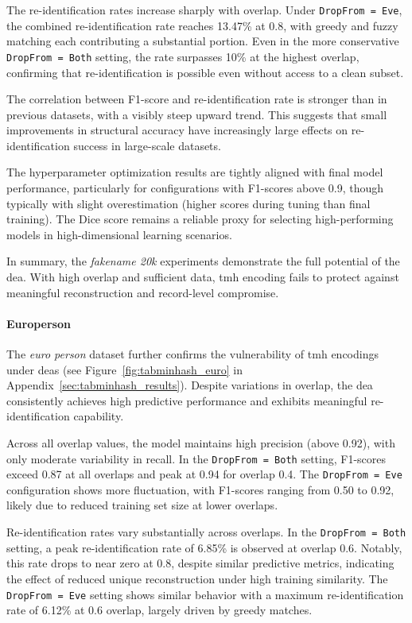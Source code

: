 The re-identification rates increase sharply with overlap.
Under \texttt{DropFrom = Eve}, the combined re-identification rate reaches 13.47\% at 0.8, with greedy and fuzzy matching each contributing a substantial portion.
Even in the more conservative \texttt{DropFrom = Both} setting, the rate surpasses 10\% at the highest overlap, confirming that re-identification is possible even without access to a clean subset.

The correlation between F1-score and re-identification rate is stronger than in previous datasets, with a visibly steep upward trend.
This suggests that small improvements in structural accuracy have increasingly large effects on re-identification success in large-scale datasets.

The hyperparameter optimization results are tightly aligned with final model performance, particularly for configurations with F1-scores above 0.9, though typically with slight overestimation (higher scores during tuning than final training).
The Dice score remains a reliable proxy for selecting high-performing models in high-dimensional learning scenarios.

In summary, the \textit{fakename 20k} experiments demonstrate the full potential of the \ac{dea}.
With high overlap and sufficient data, \ac{tmh} encoding fails to protect against meaningful reconstruction and record-level compromise.


\paragraph{Europerson}

The \textit{euro person} dataset further confirms the vulnerability of \ac{tmh} encodings under \ac{dea}s (see Figure~\ref{fig:tabminhash_euro} in Appendix~\ref{sec:tabminhash_results}).
Despite variations in overlap, the \ac{dea} consistently achieves high predictive performance and exhibits meaningful re-identification capability.

Across all overlap values, the model maintains high precision (above 0.92), with only moderate variability in recall.
In the \texttt{DropFrom = Both} setting, F1-scores exceed 0.87 at all overlaps and peak at 0.94 for overlap 0.4.
The \texttt{DropFrom = Eve} configuration shows more fluctuation, with F1-scores ranging from 0.50 to 0.92, likely due to reduced training set size at lower overlaps.

Re-identification rates vary substantially across overlaps.
In the \texttt{DropFrom = Both} setting, a peak re-identification rate of 6.85\% is observed at overlap 0.6.
Notably, this rate drops to near zero at 0.8, despite similar predictive metrics, indicating the effect of reduced unique reconstruction under high training similarity.
The \texttt{DropFrom = Eve} setting shows similar behavior with a maximum re-identification rate of 6.12\% at 0.6 overlap, largely driven by greedy matches.

